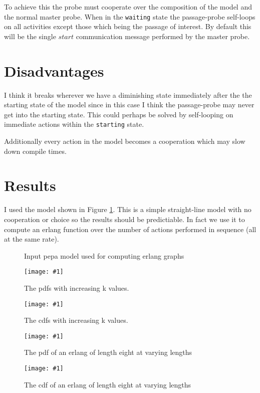 \documentclass[10pt,a4paper]{article}
\begin{document}
To achieve this the probe must cooperate over the composition of the model
and the normal master probe. When in the \texttt{waiting} state the passage-probe
self-loops on all activities except those which being the passage of interest.
By default this will be the single $start$ communication message performed by the
master probe.

\section{Disadvantages}
I think it breaks wherever we have a diminishing state immediately after
the the starting state of the model since in this case I think the passage-probe
may never get into the starting state.
This could perhaps be solved by self-looping on immediate actions within the
\texttt{starting} state.

Additionally every action in the model becomes a cooperation which may slow
down compile times.


\section{Results}
I used the model shown in Figure
\ref{figure:erlangpepa}.
This is a simple straight-line model with no cooperation or choice
so the results should be predictiable. In fact we use it to compute
an erlang function over the number of actions performed in sequence
(all at the same rate).

\begin{figure}

\caption{
\label{figure:erlangpepa}
Input pepa model used for computing erlang graphs
}
\end{figure}

\newcommand{\graphicfigure}[3]{
\begin{figure}
\texttt{[image: \#1]}
\caption{
\label{#2}
#3
}
\end{figure}
}

\graphicfigure{../pdfk.pdf}
              {figure:erlangpdfk}
              {The pdfs with increasing k values.}

\graphicfigure{../cdfk.pdf}
              {figure:erlangcdfk}
              {The cdfs with increasing k values.}

\graphicfigure{../ratepdf.pdf}
              {figure:ratepdfs}
              {The pdf of an erlang of length eight at varying lengths}

\graphicfigure{../ratecdf.pdf}
              {figure:ratecdfs}
              {The cdf of an erlang of length eight at varying lengths}







\end{document}
